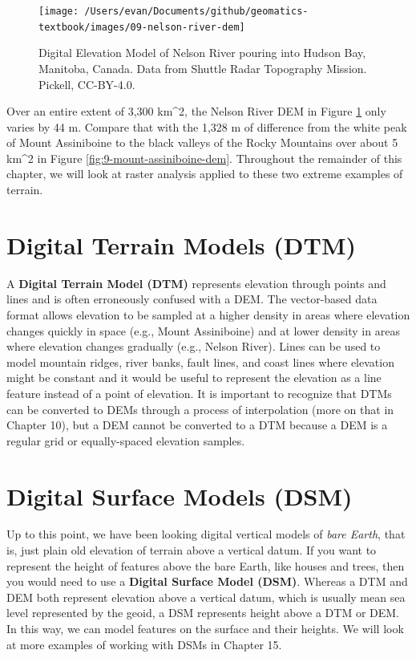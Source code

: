 \documentclass[
]{book}
\begin{document}
\begin{figure}
\texttt{[image: /Users/evan/Documents/github/geomatics-textbook/images/09-nelson-river-dem]} \caption{Digital Elevation Model of Nelson River pouring into Hudson Bay, Manitoba, Canada. Data from Shuttle Radar Topography Mission. Pickell, CC-BY-4.0.}\label{fig:9-nelson-river-dem}
\end{figure}

Over an entire extent of 3,300 km\^{}2, the Nelson River DEM in Figure \ref{fig:9-nelson-river-dem} only varies by 44 m. Compare that with the 1,328 m of difference from the white peak of Mount Assiniboine to the black valleys of the Rocky Mountains over about 5 km\^{}2 in Figure \ref{fig:9-mount-assiniboine-dem}. Throughout the remainder of this chapter, we will look at raster analysis applied to these two extreme examples of terrain.

\hypertarget{digital-terrain-models-dtm}{%
\section{Digital Terrain Models (DTM)}\label{digital-terrain-models-dtm}}

A \textbf{Digital Terrain Model (DTM)} represents elevation through points and lines and is often erroneously confused with a DEM. The vector-based data format allows elevation to be sampled at a higher density in areas where elevation changes quickly in space (e.g., Mount Assiniboine) and at lower density in areas where elevation changes gradually (e.g., Nelson River). Lines can be used to model mountain ridges, river banks, fault lines, and coast lines where elevation might be constant and it would be useful to represent the elevation as a line feature instead of a point of elevation. It is important to recognize that DTMs can be converted to DEMs through a process of interpolation (more on that in Chapter 10), but a DEM cannot be converted to a DTM because a DEM is a regular grid or equally-spaced elevation samples.

\hypertarget{digital-surface-models-dsm}{%
\section{Digital Surface Models (DSM)}\label{digital-surface-models-dsm}}

Up to this point, we have been looking digital vertical models of \emph{bare Earth}, that is, just plain old elevation of terrain above a vertical datum. If you want to represent the height of features above the bare Earth, like houses and trees, then you would need to use a \textbf{Digital Surface Model (DSM)}. Whereas a DTM and DEM both represent elevation above a vertical datum, which is usually mean sea level represented by the geoid, a DSM represents height above a DTM or DEM. In this way, we can model features on the surface and their heights. We will look at more examples of working with DSMs in Chapter 15.
\end{document}

